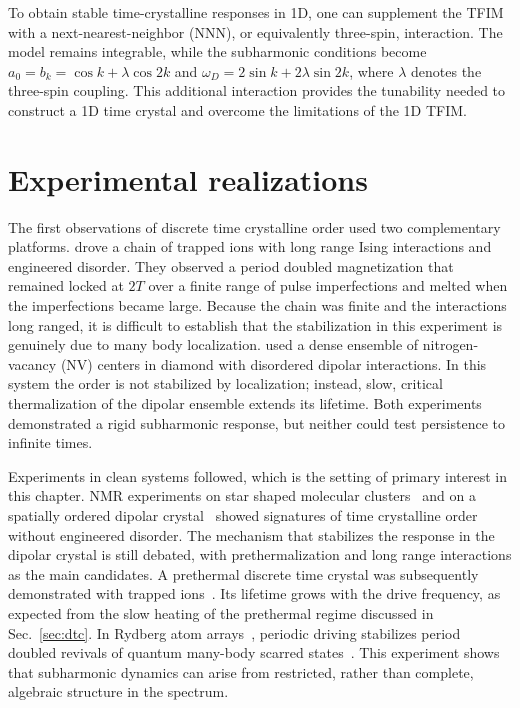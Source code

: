 \documentclass[%
reprint,
superscriptaddress,
amsmath,amssymb,
aps,
prb,
showkeys,%
floatfix,
]{revtex4-2}
\let\cite\citep   %
\begin{document}
	To obtain stable time-crystalline responses in 1D, one can supplement the TFIM with a next-nearest-neighbor (NNN), or equivalently three-spin, interaction. The model remains integrable, while the subharmonic conditions become $a_{0}=b_{k}=\cos k+\lambda\cos 2k$ and $\omega_D=2\sin k+2\lambda\sin 2k$, where $\lambda$ denotes the three-spin coupling. This additional interaction provides the tunability needed to construct a 1D time crystal and overcome the limitations of the 1D TFIM.
	
	\section{\label{sec:experiments}Experimental realizations}
	
	The first observations of discrete time crystalline order used two complementary platforms. \citet{Zhang2017} drove a chain of trapped ions with long range Ising interactions and engineered disorder. They observed a period doubled magnetization that remained locked at $2T$ over a finite range of pulse imperfections and melted when the imperfections became large. Because the chain was finite and the interactions long ranged, it is difficult to establish that the stabilization in this experiment is genuinely due to many body localization. \citet{Choi2017} used a dense ensemble of nitrogen-vacancy (NV) centers in diamond with disordered dipolar interactions. In this system the order is not stabilized by localization; instead, slow, critical thermalization of the dipolar ensemble extends its lifetime. Both experiments demonstrated a rigid subharmonic response, but neither could test persistence to infinite times.
	
	Experiments in clean systems followed, which is the setting of primary interest in this chapter. NMR experiments on star shaped molecular clusters~\cite{Pal2018} and on a spatially ordered dipolar crystal~\cite{Rovny2018} showed signatures of time crystalline order without engineered disorder. The mechanism that stabilizes the response in the dipolar crystal is still debated, with prethermalization and long range interactions as the main candidates. A prethermal discrete time crystal was subsequently demonstrated with trapped ions~\cite{Kyprianidis2021}. Its lifetime grows with the drive frequency, as expected from the slow heating of the prethermal regime discussed in Sec.~\ref{sec:dtc}. In Rydberg atom arrays~\cite{Bluvstein2021}, periodic driving stabilizes period doubled revivals of quantum many-body scarred states~\cite{Turner2018,SerbynScarsReview2021}. This experiment shows that subharmonic dynamics can arise from restricted, rather than complete, algebraic structure in the spectrum.
	
\end{document}

